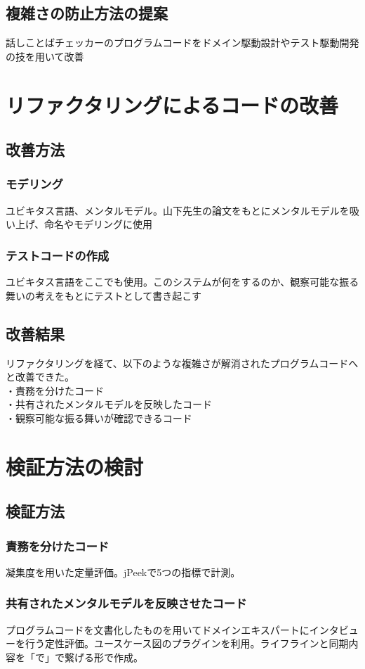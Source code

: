 \documentclass[11pt, a4paper]{jreport}
\begin{document}
\section{複雑さの防止方法の提案}
話しことばチェッカーのプログラムコードをドメイン駆動設計やテスト駆動開発の技を用いて改善
\chapter{リファクタリングによるコードの改善}
\section{改善方法}
\subsection{モデリング}
ユビキタス言語、メンタルモデル。山下先生の論文をもとにメンタルモデルを吸い上げ、命名やモデリングに使用
\subsection{テストコードの作成}
ユビキタス言語をここでも使用。このシステムが何をするのか、観察可能な振る舞いの考えをもとにテストとして書き起こす
\section{改善結果}

リファクタリングを経て、以下のような複雑さが解消されたプログラムコードへと改善できた。
\\・責務を分けたコード
\\・共有されたメンタルモデルを反映したコード
\\・観察可能な振る舞いが確認できるコード

\chapter{検証方法の検討}
\section{検証方法}
\subsection{責務を分けたコード}
凝集度を用いた定量評価。jPeekで5つの指標で計測。
\subsection{共有されたメンタルモデルを反映させたコード}
プログラムコードを文書化したものを用いてドメインエキスパートにインタビューを行う定性評価。ユースケース図のプラグインを利用。ライフラインと同期内容を「で」で繋げる形で作成。
\end{document}
